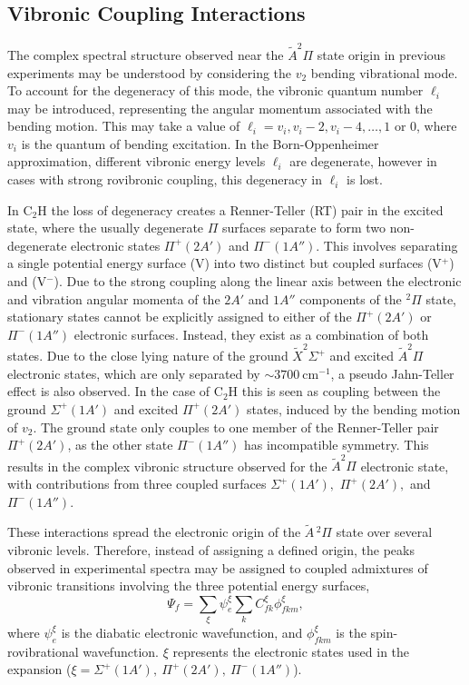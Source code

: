 \documentclass[aip,graphicx]{revtex4-1}
\begin{document}
\subsection{Vibronic Coupling Interactions}
The complex spectral structure observed near the $\tilde{A}^2\Pi$ state origin in previous experiments may be understood by considering the $v_2$ bending vibrational mode. To account for the degeneracy of this mode, the vibronic quantum number $\ell_i$ may be introduced, representing the angular momentum associated with the bending motion. This may take a value of $\ell_i = v_i, v_i-2, v_i-4,\dots,1$ or $0$, where $v_i$ is the quantum of bending excitation. In the Born-Oppenheimer approximation, different vibronic energy levels $\ell_i$ are degenerate, however in cases with strong rovibronic coupling, this degeneracy in $\ell_i$ is lost. 

In C$_2$H the loss of degeneracy creates a Renner-Teller (RT) pair in the excited state, where the usually degenerate $\Pi$ surfaces separate to form two non-degenerate electronic states $\Pi^+ (2A')$ and $\Pi^-(1A'')$. This involves separating a single potential energy surface (V) into two distinct but coupled surfaces (V$^+$) and (V$^-$). Due to the strong coupling along the linear axis between the electronic and vibration angular momenta of the $2A'$ and $1A''$ components of the $^2\Pi$ state, stationary states cannot be explicitly assigned to either of the $\Pi^+(2A')$ or $\Pi^-(1A'')$ electronic surfaces. Instead, they exist as a combination of both states. Due to the close lying nature of the ground {$\tilde{X} ^2\Sigma^+$} and excited {$\tilde{A} ^2\Pi$} electronic states, which are only separated by $\sim3700~$cm$^{-1}$, a pseudo Jahn-Teller effect is also observed. In the case of C$_2$H this is seen as coupling between the ground $\Sigma^+(1A')$ and excited $\Pi^+(2A')$ states, induced by the bending motion of $v_2$. The ground state only couples to one member of the Renner-Teller pair $\Pi^+(2A')$, as the other state $\Pi^-(1A'')$ has incompatible symmetry. This results in the complex vibronic structure observed for the $\tilde{A}^2\Pi$ electronic state, with contributions from three coupled surfaces $\Sigma^+(1A'),$ $\Pi^+(2A'),$ and $\Pi^-(1A'')$.

These interactions spread the electronic origin of the $\tilde{A}\,^2\Pi$ state over several vibronic levels. Therefore, instead of assigning a defined origin, the peaks observed in experimental spectra may be assigned to coupled admixtures of vibronic transitions involving the three potential energy surfaces,
\begin{equation}
\Psi_f = \sum_\xi \psi_e^\xi \sum_k C_{fk}^\xi\phi_{fkm}^\xi,
\label{eq:3} 
\end{equation}
where $\psi_e^\xi$ is the diabatic electronic wavefunction, and $\phi_{fkm}^\xi$ is the spin-rovibrational wavefunction. $\xi$ represents the electronic states used in the expansion ($\xi=\Sigma^+(1A'),~\Pi^+(2A'),~\Pi^-(1A'')$).
\end{document}
